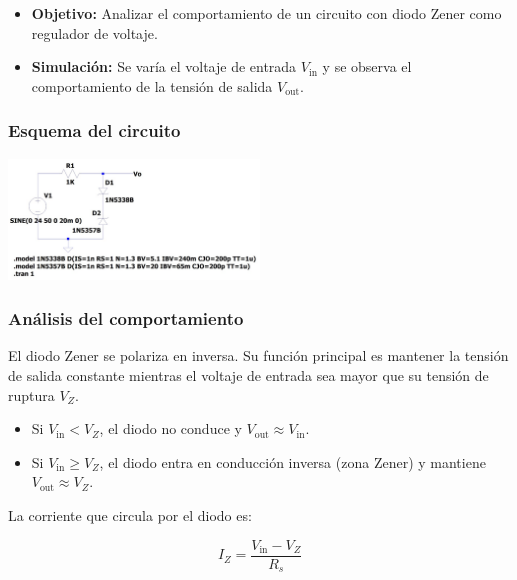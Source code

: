 \documentclass[chaptersright]{informeutn}
\begin{document}
\begin{itemize}
    \item \textbf{Objetivo:} Analizar el comportamiento de un circuito con diodo Zener como regulador de voltaje.
    \item \textbf{Simulación:} Se varía el voltaje de entrada \( V_{\text{in}} \) y se observa el comportamiento de la tensión de salida \( V_{\text{out}} \).
\end{itemize}

\subsubsection*{Esquema del circuito}
\begin{center}
    \includegraphics[width=0.5\textwidth]{pictures/zener_1_circuito.jpeg}
\end{center}

\subsubsection*{Análisis del comportamiento}

El diodo Zener se polariza en inversa. Su función principal es mantener la tensión de salida constante mientras el voltaje de entrada sea mayor que su tensión de ruptura \( V_Z \).

\begin{itemize}
    \item Si \( V_{\text{in}} < V_Z \), el diodo no conduce y \( V_{\text{out}} \approx V_{\text{in}} \).
    \item Si \( V_{\text{in}} \geq V_Z \), el diodo entra en conducción inversa (zona Zener) y mantiene \( V_{\text{out}} \approx V_Z \).
\end{itemize}

La corriente que circula por el diodo es:

\[
I_Z = \frac{V_{\text{in}} - V_Z}{R_s}
\]
\end{document}
